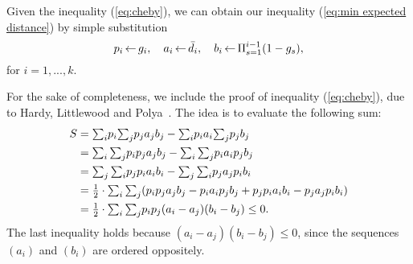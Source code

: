\documentclass[oneside,final]{ucr}
\begin{document}
Given the inequality (\ref{eq:cheby}), we can obtain our
inequality (\ref{eq:min expected distance}) by simple
substitution
%
\begin{equation*}
  p_i {\,\leftarrow\,} g_i,\quad a_i {\,\leftarrow\,} {\bar d}_i,\quad b_i {\,\leftarrow\,}
  \Pi_{s=1}^{i-1} (1-g_s),
\end{equation*}
%
for $i = 1,...,k$.

For the sake of completeness, we include the proof of
inequality (\ref{eq:cheby}), due to Hardy, Littlewood and
Polya~\cite{HardyLP88}. The idea is to evaluate the
following sum:
%
\begin{align*}
  S &= \textstyle{\sum_i} p_i \textstyle{\sum_j} p_j a_j b_j - \textstyle{\sum_i} p_i a_i \textstyle{\sum_j} p_j b_j
	\\
  & = \textstyle{\sum_i \sum_j} p_i p_j a_j b_j - \textstyle{\sum_i \sum_j} p_i a_i p_j b_j
	\\
  & = \textstyle{\sum_j \sum_i} p_j p_i a_i b_i - \textstyle{\sum_j \sum _i} p_j a_j p_i b_i
	\\
	&= {\mbox{$\frac{1}{2}$}} \cdot \textstyle{\sum_i \sum_j} (p_i p_j a_j b_j - p_i a_i p_j b_j + p_j p_i a_i
  							b_i - p_j a_j p_i b_i)
\\
  &= {\mbox{$\frac{1}{2}$}} \cdot \textstyle{\sum_i \sum_j} p_i p_j (a_i - a_j)(b_i - b_j) \leq 0.
\end{align*}
The last inequality holds because $(a_i-a_j)(b_i-b_j) \leq
0$, since the sequences $(a_i)$ and $(b_i)$ are ordered
oppositely.
\end{document}
